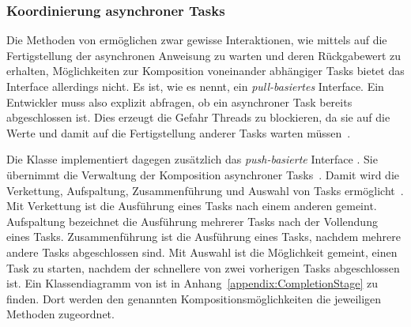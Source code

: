 \subsubsection{Koordinierung asynchroner Tasks}\label{sec:CompletableFuture}
Die Methoden von  ermöglichen zwar gewisse Interaktionen, wie mittels  auf die Fertigstellung der asynchronen \gls{Anweisung} zu warten und deren Rückgabewert zu erhalten, Möglichkeiten zur Komposition voneinander abhängiger Tasks bietet das Interface allerdings nicht. Es ist, wie \textcite[S.~240]{Hettel2016} es nennt, ein \emph{pull-basiertes} Interface. Ein Entwickler muss also explizit abfragen, ob ein asynchroner Task bereits abgeschlossen ist. Dies erzeugt die Gefahr Threads zu blockieren, da sie auf die Werte und damit auf die Fertigstellung anderer Tasks warten müssen~\cite[S.~239]{Hettel2016}.

Die Klasse  implementiert dagegen zusätzlich das \emph{push-basierte} Interface . Sie übernimmt die Verwaltung der Komposition asynchroner Tasks~\cite[S.~240~ff.]{Hettel2016}. Damit wird die Verkettung, Aufspaltung, Zusammenführung und Auswahl von Tasks ermöglicht~\cite[S.~250~ff.]{Hettel2016}. Mit Verkettung ist die Ausführung eines Tasks nach einem anderen gemeint. Aufspaltung bezeichnet die Ausführung mehrerer Tasks nach der Vollendung eines Tasks. Zusammenführung ist die Ausführung eines Tasks, nachdem mehrere andere Tasks abgeschlossen sind. Mit Auswahl ist die Möglichkeit gemeint, einen Task zu starten, nachdem der schnellere von zwei vorherigen Tasks abgeschlossen ist. Ein Klassendiagramm von  ist in Anhang~\ref{appendix:CompletionStage} zu finden. Dort werden den genannten Kompositionsmöglichkeiten die jeweiligen Methoden zugeordnet.